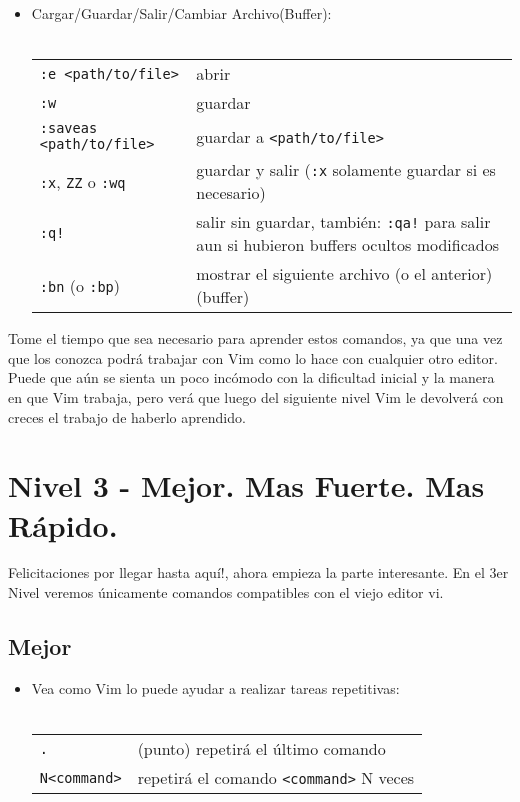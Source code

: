 \documentclass[12pt]{article}
\begin{document}
\begin{itemize}
	\item Cargar/Guardar/Salir/Cambiar Archivo(Buffer): \\ \\
\begin{tabular}{ l l }
            \texttt{:e <path/to/file>} & abrir \\
            \texttt{:w} & guardar \\
            \texttt{:saveas <path/to/file>} & guardar a \texttt{<path/to/file>} \\
            \texttt{:x}, \texttt{ZZ} o \texttt{:wq} & guardar y salir (\texttt{:x} solamente guardar si es necesario) \\
            \texttt{:q!} & salir sin guardar, también: \texttt{:qa!} para salir aun si hubieron buffers ocultos modificados \\
            \texttt{:bn} (o \texttt{:bp}) & mostrar el siguiente archivo (o el anterior) (buffer) \\
\end{tabular}
\end{itemize}



Tome el tiempo que sea necesario para aprender estos comandos,
ya que una vez que los conozca podrá trabajar con Vim como lo
hace con cualquier otro editor. Puede que aún se sienta un poco incómodo 
con la dificultad inicial y la manera en que Vim trabaja, pero verá
que luego del siguiente nivel Vim le devolverá con creces el trabajo
de haberlo aprendido.


\section{Nivel 3 - Mejor. Mas Fuerte. Mas Rápido.}


Felicitaciones por llegar hasta aquí!, ahora empieza la parte interesante.
En el 3er Nivel veremos únicamente comandos compatibles con el viejo editor vi.


\subsection{Mejor}


\begin{itemize}
	\item Vea como Vim lo puede ayudar a realizar tareas repetitivas: \\ \\
\begin{tabular}{ l l }
	\texttt{.} & (punto) repetirá el último comando \\
	\texttt{N<command>} & repetirá el comando \texttt{<command>} N veces \\
\end{tabular}
\end{itemize}
\end{document}
